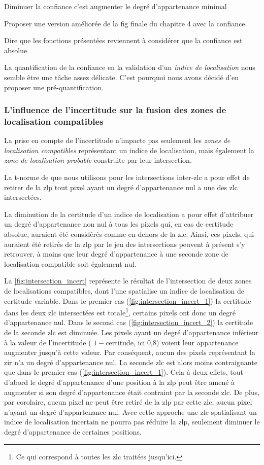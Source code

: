 Diminuer la confiance c'est augmenter le degré d'appartenance minimal

Proposer une version améliorée de la fig finale du chapitre 4 avec la
confiance.

Dire que les fonctions présentées reviennent à considérer que la
confiance est absolue


La quantification de la confiance en la validation d'un \emph{indice
  de localisation} nous semble être une tâche assez délicate. C'est
pourquoi nous avons décidé d'en proposer une pré-quantification.


\subsubsection{L'influence de l'incertitude sur la fusion des zones de
  localisation compatibles}

La prise en compte de l'incertitude n'impacte pas seulement les
\emph{zones de localisation compatibles} représentant un indice de
localisation, mais également la \emph{zone de localisation probable}
construite par leur intersection.

La t-norme de  que nous utilisons pour les intersections
inter-\ac{zlc} a pour effet de retirer de la \ac{zlp} tout pixel ayant
un degré d'appartenance nul a une des \ac{zlc} intersectées.

La diminution de la certitude d'un indice de localisation a pour effet
d'attribuer un degré d'appartenance non nul à tous les pixels qui, en
cas de certitude absolue, auraient été considérés comme en dehors de
la \ac{zlc}. Ainsi, ces pixels, qui auraient été retirés de la
\ac{zlp} par le jeu des intersections peuvent à présent s'y retrouver,
à moins que leur degré d'appartenance à une seconde zone de
localisation compatible soit également nul.

La \autoref{fig:intersection_incert} représente le résultat de
l'intersection de deux zones de localisations compatibles, dont l'une
spatialise un indice de localisation de certitude variable. Dans le
premier cas (\ref{fig:intersection_incert_1}) la certitude dans les
deux \ac{zlc} intersectées est totale\footnote{Ce qui correspond à
  toutes les \ac{zlc} traitées jusqu'ici.}, certains pixels ont donc
un degré d'appartenance nul.
%
Dans le second cas (\ref{fig:intersection_incert_2}) la certitude de
la seconde \ac{zlc} est diminuée. Les pixels ayant un degré
d'appartenance inférieur à la valeur de l'incertitude (\ie
\(1-\text{certitude}\), ici 0,8) voient leur appartenance augmenter
jusqu'à cette valeur. Par conséquent, aucun des pixels représentant la
\ac{zir} n'a un degré d'appartenance nul. La seconde \ac{zlc} est
alors moins contraignante que dans le premier cas
(\ref{fig:intersection_incert_1}). Cela à deux effets, tout d'abord le
degré d'appartenance d'une position à la \ac{zlp} peut être amené à
augmenter si son degré d'appartenance était contraint par la seconde
\ac{zlc}. De plus, par corolaire, aucun pixel ne peut être retiré de
la \ac{zlp} par cette \ac{zlc}, aucun pixel n'ayant un degré
d'appartenance nul. Avec cette approche une \ac{zlc} spatialisant un
indice de localisation incertain ne pourra pas réduire la \ac{zlp},
seulement diminuer le degré d'appartenance de certaines positions.

